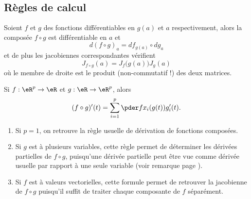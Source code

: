 
\subsection{Règles de calcul}

\begin{proposition}  \label{PROPooBWZFooTxKavX}
    Soient $f$ et $g$ des fonctions
  différentiables en $g(a)$ et $a$ respectivement, alors la composée
  $f\circ g$ est différentiable en $a$ et
  \begin{equation*}
    d (f\circ g)_a = d f_{g(a)} \circ d g_a
  \end{equation*}
  et de plus les jacobiennes correspondantes vérifient
  \begin{equation*}
      J_{f\circ g}(a) = J_f\big( g(a) \big)J_g(a)
  \end{equation*}
  où le membre de droite est le produit (non-commutatif !) des deux matrices.
\end{proposition}

\begin{corollary} Si $f : \eR^p \to \eR$ et $g : \eR \to
  \eR^p$, alors
  \begin{equation*}
    (f\circ g)^\prime(t) = \sum_{i=1}^p \pder f {x_i}(g(t)) g_i^\prime(t).
  \end{equation*}
\end{corollary}

\begin{remark}
  \begin{enumerate}
  \item Si $p = 1$, on retrouve la règle usuelle de dérivation de
    fonctions composées.

  \item 
      Si $g$ est à plusieurs variables, cette règle permet de déterminer les dérivées partielles de $f \circ g$, puisqu'une dérivée partielle peut être vue comme dérivée usuelle par rapport à une seule variable (voir remarque page \pageref{deriveepartielles}).

  \item Si $f$ est à valeurs vectorielles, cette formule permet de
    retrouver la jacobienne de $f \circ g$ puisqu'il suffit de traiter
    chaque composante de $f$ séparément.
  \end{enumerate}
\end{remark}



